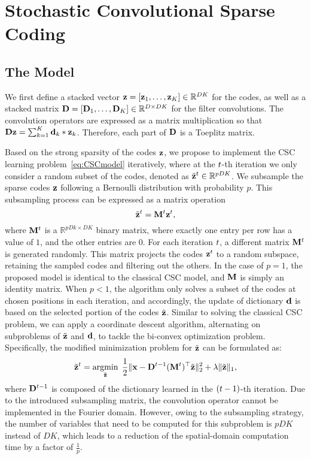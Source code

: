 \section{Stochastic Convolutional Sparse Coding}
\subsection{The Model}
We first define a stacked vector $\code = [\code_1, \dots, \code_K]
\in \mathbb{R}^{DK}$ for the codes, as well as a stacked matrix
$\Filter = [\Filter_1, \dots, \Filter_K] \in \mathbb{R}^{D \times DK}$
for the filter convolutions. The convolution operators are expressed
as a matrix multiplication so that $ \Filter \code = \sum_{k=1}^{K}
\filter_k * \code_k$.  Therefore, each part of $\Filter$ is a Toeplitz
matrix.

Based on the strong sparsity of the codes $\code$, we propose to
implement the CSC learning problem~\eqref{eq:CSCmodel} iteratively,
where at the $t$-th iteration we only consider a random subset of
the codes, denoted as $\subcode^t\in \mathbb{R}^{pDK}$.  We subsample
the sparse codes $\code$ following a Bernoulli distribution with
probability $p$. This subsampling process can be expressed as a matrix
operation
\begin{equation}
    \subcode^t = \mask^{\ite} \code^\ite,
\end{equation}
where $\mask^{\ite}$ is a $\mathbb{R}^{pDk \times DK}$ binary matrix,
where exactly one entry per row has a value of $1$, and the other
entries are $0$. For each iteration $t$, a different matrix
$\mask^{\ite}$ is generated randomly. This matrix projects the
codes $\code^\ite$ to a random subspace, retaining the sampled codes
and filtering out the others. In the case of $p=1$, the proposed model
is identical to the classical CSC model, and $\mask$ is simply an
identity matrix. When $p<1$, the algorithm only solves a subset of the
codes at chosen positions in each iteration, and accordingly, the
update of dictionary $\filter$ is based on the selected portion of the
codes $\subcode$. Similar to solving the classical CSC problem, we can
apply a coordinate descent algorithm, alternating on subproblems of
$\subcode$ and $\filter$, to tackle the bi-convex optimization
problem. Specifically, the modified minimization problem for
$\subcode$ can be formulated as:
\begin{equation} \label{eq:updatingCode}
    \subcode^{\ite} = \minimize{\subcode} \frac{1}{2}\| \signal - \Filter^{\ite-1} (\mask^{\ite})^\top \subcode \|_2^2 + \lambda \| \subcode \|_1,
\end{equation}
where $\Filter^{\ite-1}$ is composed of the dictionary learned in the
$(t-1)$-th iteration.
 Due to the introduced subsampling matrix, the convolution
operator cannot be implemented in the Fourier domain. However, owing
to the subsampling strategy, the number of variables that need to be
computed for this subproblem is $pDK$ instead of $DK$, which leads to
a reduction of the spatial-domain computation time by a factor of
$\frac{1}{p}$.

